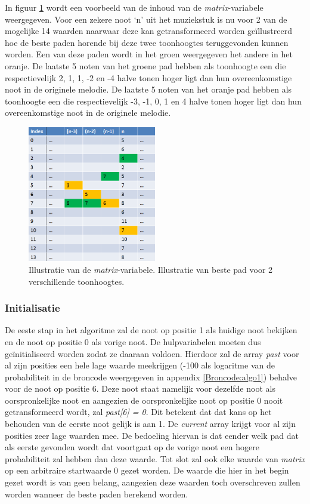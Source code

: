 In figuur \ref{figuur:matrix} wordt een voorbeeld van de inhoud van de \textit{matrix}-variabele weergegeven. Voor een zekere noot `n' uit het muziekstuk is nu voor 2 van de mogelijke 14 waarden naarwaar deze kan getransformeerd worden ge\"illustreerd hoe de beste paden horende bij deze twee toonhoogtes teruggevonden kunnen worden. Een van deze paden wordt in het groen weergegeven het andere in het oranje. De laatste 5 noten van het groene pad hebben als toonhoogte een die respectievelijk 2, 1, 1, -2 en -4 halve tonen hoger ligt dan hun overeenkomstige noot in de originele melodie. De laatste 5 noten van het oranje pad hebben als toonhoogte een die respectievelijk -3, -1, 0, 1 en 4 halve tonen hoger ligt dan hun overeenkomstige noot in de originele melodie. 

\begin{figure}[!ht]
  \centering
  \includegraphics[width=0.5\textwidth]{4_Efficient_Toepassen_Transformatie/matrix}
  \caption{Illustratie van de \textit{matrix}-variabele. Illustratie van beste pad voor 2 verschillende toonhoogtes.}
  \label{figuur:matrix}
\end{figure}

\subsubsection{Initialisatie}
De eeste stap in het algoritme zal de noot op positie 1 als huidige noot bekijken en de noot op positie 0 als vorige noot. De hulpvariabelen moeten dus ge\"initialiseerd worden zodat ze daaraan voldoen. Hierdoor zal de array \textit{past} voor al zijn posities een hele lage waarde meekrijgen (-100 als logaritme van de probabiliteit in de broncode weergegeven in appendix \ref{Broncode:algo1}) behalve voor de noot op positie 6. Deze noot staat namelijk voor dezelfde noot als oorspronkelijke noot en aangezien de oorspronkelijke noot op positie 0 nooit getransformeerd wordt, zal \textit{past[6] = 0}. Dit betekent dat dat kans op het behouden van de eerste noot gelijk is aan 1. De \textit{current} array krijgt voor al zijn posities zeer lage waarden mee. De bedoeling hiervan is dat eender welk pad dat als eerste gevonden wordt dat voortgaat op de vorige noot een hogere probabiliteit zal hebben dan deze waarde. Tot slot zal ook elke waarde van \textit{matrix} op een arbitraire startwaarde 0 gezet worden. De waarde die hier in het begin gezet wordt is van geen belang, aangezien deze waarden toch overschreven zullen worden wanneer de beste paden berekend worden.


